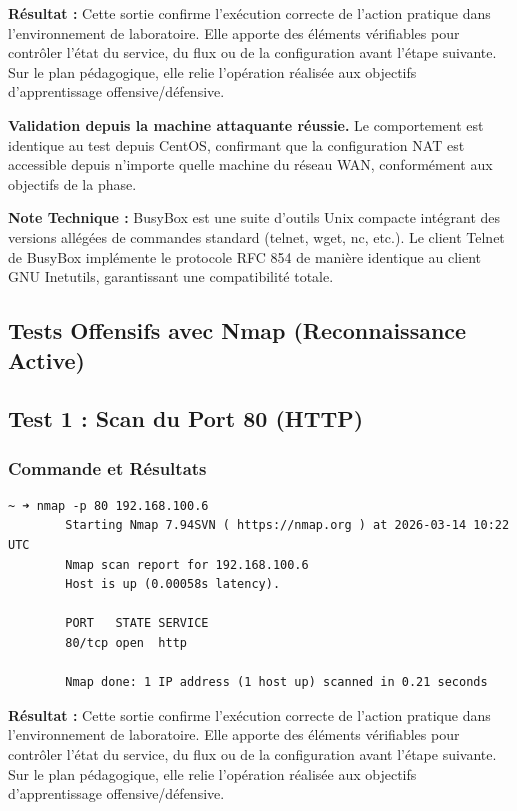 \documentclass[12pt,a4paper,openany]{report}
\begin{document}
	\textbf{Résultat :} Cette sortie confirme l'exécution correcte de l'action pratique dans l'environnement de laboratoire. Elle apporte des éléments vérifiables pour contrôler l'état du service, du flux ou de la configuration avant l'étape suivante. Sur le plan pédagogique, elle relie l'opération réalisée aux objectifs d'apprentissage offensive/défensive.
	
	
	\textcolor{green}{\checkmark} \textbf{Validation depuis la machine attaquante réussie.} Le comportement est
	identique au test depuis CentOS, confirmant que la configuration NAT est accessible
	depuis n'importe quelle machine du réseau WAN, conformément aux objectifs de la phase.
	
	\textbf{Note Technique :} BusyBox est une suite d'outils Unix compacte intégrant
	des versions allégées de commandes standard (telnet, wget, nc, etc.). Le client
	Telnet de BusyBox implémente le protocole RFC 854 de manière identique au client
	GNU Inetutils, garantissant une compatibilité totale.
	
	\subsection{Tests Offensifs avec Nmap (Reconnaissance Active)}
	
	\subsection{Test 1 : Scan du Port 80 (HTTP)}
	\subsubsection{Commande et Résultats}
	\begin{lstlisting}[caption=Scan Nmap du port HTTP]
		~ ➜ nmap -p 80 192.168.100.6
		Starting Nmap 7.94SVN ( https://nmap.org ) at 2026-03-14 10:22 UTC
		Nmap scan report for 192.168.100.6
		Host is up (0.00058s latency).
		
		PORT   STATE SERVICE
		80/tcp open  http
		
		Nmap done: 1 IP address (1 host up) scanned in 0.21 seconds
	\end{lstlisting}
	
	\textbf{Résultat :} Cette sortie confirme l'exécution correcte de l'action pratique dans l'environnement de laboratoire. Elle apporte des éléments vérifiables pour contrôler l'état du service, du flux ou de la configuration avant l'étape suivante. Sur le plan pédagogique, elle relie l'opération réalisée aux objectifs d'apprentissage offensive/défensive.
	
\end{document}
